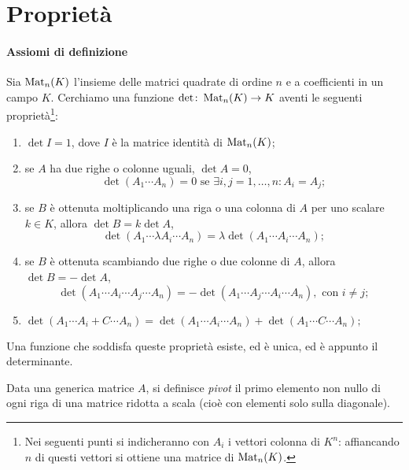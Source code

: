 \section{Proprietà}
\paragraph{Assiomi di definizione}
Sia $\operatorname{Mat}_n(K)$ l'insieme delle matrici quadrate di ordine $n$ e a coefficienti in un campo $K$.
Cerchiamo una funzione $\det\colon\operatorname{Mat}_n(K)\to K$ aventi le seguenti proprietà\footnote{Nei seguenti punti si indicheranno con $A_i$ i vettori colonna di $K^n$: affiancando $n$ di questi vettori si ottiene una matrice di $\operatorname{Mat}_n(K)$.}:
\begin{enumerate}[label=(\roman*)]
	\item $\det I=1$, dove $I$ è la matrice identità di $\operatorname{Mat}_n(K)$;
	\item se $A$ ha due righe o colonne uguali, $\det A=0$,
		\begin{equation*}
		\det(A_1\cdots A_n)=0\text{ se }\exists i,j=1,\dots,n\colon A_i=A_j;
		\end{equation*}
	\item se $B$ è ottenuta moltiplicando una riga o una colonna di $A$ per uno scalare $k\in K$, allora $\det B=k\det A$,
		\begin{equation*}
		\det(A_1\cdots\lambda A_i\cdots A_n)=\lambda\det(A_1\cdots A_i\cdots A_n);
		\end{equation*}
	\item se $B$ è ottenuta scambiando due righe o due colonne di $A$, allora $\det B=-\det A$,
		\begin{equation*}
		\det(A_1\cdots A_i\cdots A_j\cdots A_n)=-\det(A_1\cdots A_j\cdots A_i\cdots A_n),\text{ con }i\neq j;
		\end{equation*}
	\item $\det(A_1\cdots A_i+C\cdots A_n)=\det(A_1\cdots A_i\cdots A_n)+\det(A_1\cdots C\cdots A_n);$ 
\end{enumerate}
Una funzione che soddisfa queste proprietà esiste, ed è unica, ed è appunto il determinante.

\begin{definizione}\label{d:pivot}
Data una generica matrice $A$, si definisce \emph{pivot} il primo elemento non nullo di ogni riga di una matrice ridotta a scala (cioè con elementi solo sulla diagonale).
\end{definizione}

